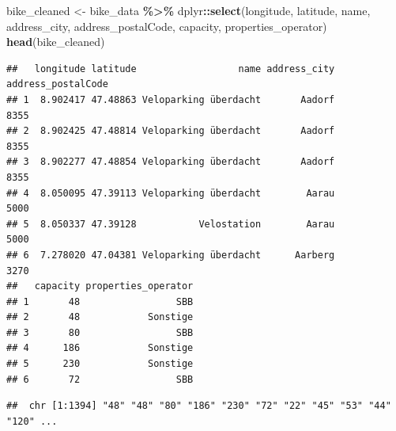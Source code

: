 \documentclass[
]{book}
\newenvironment{Shaded}{\begin{snugshade}}{\end{snugshade}}
\newcommand{\CommentTok}[1]{\textcolor[rgb]{0.56,0.35,0.01}{\textit{#1}}}
\newcommand{\FunctionTok}[1]{\textcolor[rgb]{0.13,0.29,0.53}{\textbf{#1}}}
\newcommand{\NormalTok}[1]{#1}
\newcommand{\OtherTok}[1]{\textcolor[rgb]{0.56,0.35,0.01}{#1}}
\newcommand{\SpecialCharTok}[1]{\textcolor[rgb]{0.81,0.36,0.00}{\textbf{#1}}}
\begin{document}
\begin{Shaded}
\begin{Highlighting}[]
\NormalTok{bike\_cleaned }\OtherTok{\textless{}{-}}\NormalTok{ bike\_data }\SpecialCharTok{\%\textgreater{}\%}
\NormalTok{  dplyr}\SpecialCharTok{::}\FunctionTok{select}\NormalTok{(longitude, latitude, name,}
\NormalTok{                address\_city, address\_postalCode, capacity, properties\_operator)}
\FunctionTok{head}\NormalTok{(bike\_cleaned)}
\end{Highlighting}
\end{Shaded}

\begin{verbatim}
##   longitude latitude                  name address_city address_postalCode
## 1  8.902417 47.48863 Veloparking überdacht       Aadorf               8355
## 2  8.902425 47.48814 Veloparking überdacht       Aadorf               8355
## 3  8.902277 47.48854 Veloparking überdacht       Aadorf               8355
## 4  8.050095 47.39113 Veloparking überdacht        Aarau               5000
## 5  8.050337 47.39128           Velostation        Aarau               5000
## 6  7.278020 47.04381 Veloparking überdacht      Aarberg               3270
##   capacity properties_operator
## 1       48                 SBB
## 2       48            Sonstige
## 3       80                 SBB
## 4      186            Sonstige
## 5      230            Sonstige
## 6       72                 SBB
\end{verbatim}

\begin{Shaded}
\end{Shaded}

\begin{verbatim}
##  chr [1:1394] "48" "48" "80" "186" "230" "72" "22" "45" "53" "44" "120" ...
\end{verbatim}
\end{document}
